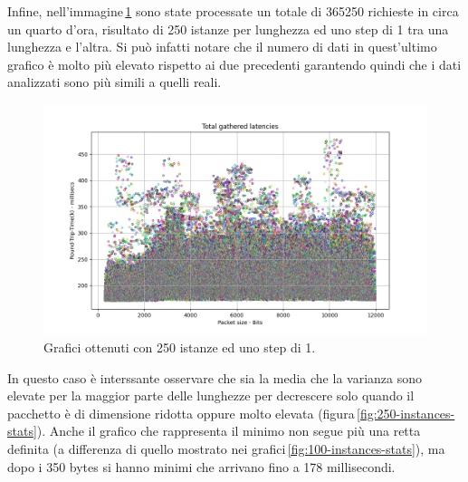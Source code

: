 \FloatBarrier\noindent Infine, nell'immagine\,\ref{fig:250-instances-total} sono state processate un totale di 365250 richieste in circa un quarto d'ora, risultato di 250 istanze per lunghezza ed uno step di 1 tra una lunghezza e l'altra. Si può infatti notare che il numero di dati in quest'ultimo grafico è molto più elevato rispetto ai due precedenti garantendo quindi che i dati analizzati sono più simili a quelli reali.
\begin{figure}[h]
    \centering
    \includegraphics[width = .9\textwidth]{hw-2/report/imgs/250-instances/la-total-latencies.png}
    \caption{Grafici ottenuti con 250 istanze ed uno step di 1.}
    \label{fig:250-instances-total}
\end{figure}
In questo caso è interssante osservare che sia la media che la varianza sono elevate per la maggior parte delle lunghezze per decrescere solo quando il pacchetto è di dimensione ridotta oppure molto elevata (figura\,\ref{fig:250-instances-stats}). Anche il grafico che rappresenta il minimo non segue più una retta definita (a differenza di quello mostrato nei grafici\,\ref{fig:100-instances-stats}), ma dopo i 350 bytes si hanno minimi che arrivano fino a 178 millisecondi.
